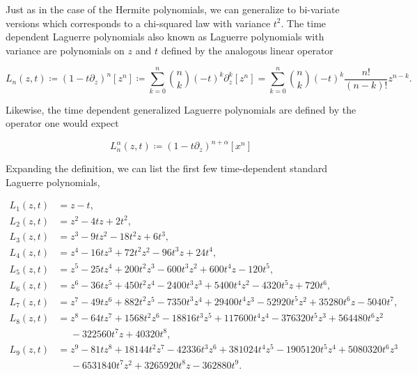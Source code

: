     Just as in the case of the Hermite polynomials, we can generalize to bi-variate versions which corresponds to a chi-squared law with variance $t^2$. The time dependent Laguerre polynomials also known as Laguerre polynomials with variance are polynomials on $z$ and $t$ defined by the analogous linear operator

    \begin{equation} \label{eq:laguerre_with_variance}
        L_n(z,t) \coloneqq (1 - t\partial_z)^n [z^n] \coloneqq \sum_{k=0}^n \binom{n}{k} (-t)^k\partial_z^k[z^n] = \sum_{k=0}^n \binom{n}{k} (-t)^k \frac{n!}{(n-k)!} z^{n-k}.
    \end{equation}

    Likewise, the time dependent generalized Laguerre polynomials are defined by the operator one would expect

    \begin{equation*}
        L_n^{\alpha}(z,t) \coloneqq \left( 1 - t\partial_z \right)^{n+\alpha}[x^n]
    \end{equation*}

    Expanding the definition, we can list the first few time-dependent standard Laguerre polynomials,

    \begin{align*}
        L_1(z,t) &= z - t, \\
        L_2(z,t) &= z^2 - 4tz + 2t^2,\\
        L_3(z,t) &= z^3 - 9tz^2 - 18t^2z + 6t^3, \\
        L_4(z,t) &= z^4 - 16tz^3 + 72t^2z^2 - 96t^3z + 24t^4,\\
        L_5(z,t) &= z^5 - 25tz^4 + 200t^2z^3 - 600t^3z^2 + 600t^4z - 120t^5,\\
        L_6(z,t) &= z^6 - 36tz^5 + 450t^2z^4 - 2400t^3z^3 + 5400t^4z^2 - 4320t^5z + 720t^6, \\
        L_7(z,t) &= z^7 - 49tz^6 + 882t^2z^5 -7350t^3z^4 + 29400t^4z^3 - 52920t^5z^2 + 35280t^6z - 5040t^7,\\
        L_8(z,t) &= z^8 - 64tz^7 + 1568t^2z^6 - 18816t^3z^5 + 117600t^4z^4 - 376320t^5z^3 + 564480t^6z^2\\ &\phantom{=}- 322560t^7z + 40320t^8,\\
        L_9(z,t) &= z^{9}-81tz^{8}+18144t^2z^{7}-42336t^3z^{6}+381024t^4z^{5}-1905120t^5z^{4}+5080320t^6z^{3}\\ 
        &\phantom{=}-6531840t^7z^{2} +3265920t^8z-362880t^9.
    \end{align*}

